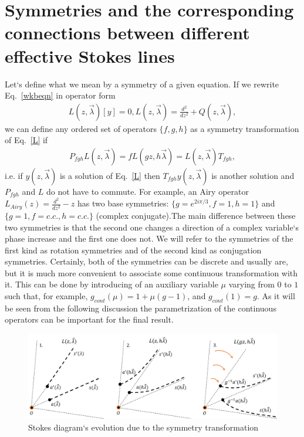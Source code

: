 \documentclass[aps,prl,preprint,superscriptaddress]{revtex4}
\begin{document}
\section{Symmetries and the corresponding connections between different effective Stokes lines \label{SMMTRS}}
Let`s define what we mean by a symmetry of a given equation. If we rewrite Eq.~\ref{wkbeqn} in operator form
\begin{eqnarray}
L(z,\vec{\lambda})[y]=0, L(z,\vec{\lambda})=\frac{d^2}{dz^2} + Q(z,\vec{\lambda}),   \label{L}
\end{eqnarray}
we can define any ordered set of operators $\{f,g,h\}$ as a symmetry transformation of Eq.~\ref{L} if
\begin{eqnarray}
P_{fgh}L(z,\vec{\lambda})=fL(gz,h\vec{\lambda})=L(z,\vec{\lambda})T_{fgh},   
\label{symmdef}
\end{eqnarray}
i.e. if $y(z,\vec{\lambda})$ is a solution of Eq.~\ref{L} then $T_{fgh}y(z,\vec{\lambda})$ is another solution and $P_{fgh}$ and $L$ do not have to commute. 
For example, an Airy operator $L_{Airy}(z) = \frac{d^2}{dz^2} - z$ has two base symmetries: $\{g=e^{2i\pi/3},f=1,h=1\}$ 
and $\{g=1,f=c.c.,h=c.c.\}$ (complex conjugate).The main difference between these two symmetries is that the second one changes a direction of a complex variable`s phase increase and the first one does not. We will refer to the symmetries of the first kind as rotation symmetries and of the second kind as conjugation symmetries. Certainly, both of the symmetries can be discrete and usually are, but it is much more convenient to associate some continuous transformation with it. This can be done by introducing of an auxiliary variable $\mu$ varying from $0$ to $1$ such that, for example, $g_{cont}(\mu)=1+\mu (g-1)$, and $g_{cont}(1)=g$. As it will be seen from the following discussion the parametrization of the continuous operators can be important for the final result.

\begin{figure}
\centering
\noindent
\includegraphics[scale=.5]{stuff/rs.png}
\caption{Stokes diagram`s evolution due to the symmetry transformation}
\label{rs}
\end{figure} 
\end{document}

